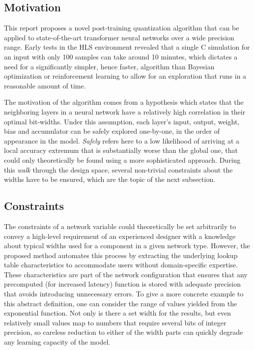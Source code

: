\subsection{Motivation}
This report proposes a novel post-training quantization algorithm that can be applied to state-of-the-art transformer neural networks over a wide precision range. Early tests in the HLS environment revealed that a single C simulation for an input with only 100 samples can take around 10 minutes, which dictates a need for a significantly simpler, hence faster, algorithm than Bayesian optimization or reinforcement learning to allow for an exploration that runs in a reasonable amount of time.

The motivation of the algorithm comes from a hypothesis which states that the neighboring layers in a neural network have a relatively high correlation in their optimal bit-widths. Under this assumption, each layer's input, output, weight, bias and accumulator can be safely explored one-by-one, in the order of appearance in the model. \textit{Safely} refers here to a low likelihood of arriving at a local accuracy extremum that is substantially worse than the global one, that could only theoretically be found using a more sophisticated approach. During this \textit{walk} through the design space, several non-trivial constraints about the widths have to be ensured, which are the topic of the next subsection.

\subsection{Constraints}
The constraints of a network variable could theoretically be set arbitrarily to convey a high-level requirement of an experienced designer with a knowledge about typical widths used for a component in a given network type. However, the proposed method automates this process by extracting the underlying lookup table characteristics to accommodate users without domain-specific expertise. These characteristics are part of the network configuration that ensures that any precomputed (for increased latency) function is stored with adequate precision that avoids introducing unnecessary errors. To give a more concrete example to this abstract definition, one can consider the range of values yielded from the exponential function. Not only is there a set width for the results, but even relatively small values map to numbers that require several bits of integer precision, so careless reduction to either of the width parts can quickly degrade any learning capacity of the model.

